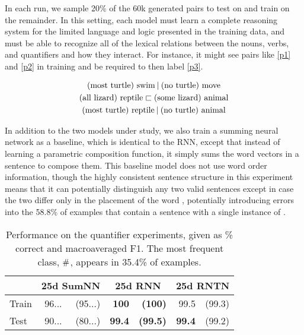 In each run, we sample 20\% of the 60k generated pairs to test on and 
train on the remainder. In this setting, each model must learn a
complete reasoning system for the limited language and logic presented
in the training data, and must be able
to recognize all of the lexical relations between the nouns, verbs,
and quantifiers and how they interact. For instance, it might see
pairs like \eqref{p1} and \eqref{p2} in training and be required to 
then label \eqref{p3}.

\vspace{-0.6cm}
\begin{gather}
  \text{(most turtle) swim} \mathbin{|} \text{(no turtle) move}\label{p1}
  \\
  \text{(all lizard) reptile} \sqsubset  \text{(some lizard) animal}\label{p2}
  \\
  \text{(most turtle) reptile} \mathbin{|} \text{(no turtle) animal}\label{p3}
\end{gather}\vspace{-0.8cm}

In addition to the two models under study, we also train a summing neural network as a baseline, 
which is identical to the RNN, except that instead of learning a parametric composition function,
it simply sums the word vectors in a sentence to compose them. This baseline model does not
use word order information, though the highly consistent sentence structure in this experiment means
that it can potentially distinguish any two valid sentences except in case the two differ only in the placement of the word , potentially introducing errors into the 58.8\% of examples that contain a sentence with a single
instance of .

\begin{table}[tp]
  \centering
  \begin{tabular}{ l r@{ \ }r r@{ \ }r r@{ \ }r }
    \toprule
    ~ & \multicolumn{2}{c}{25d SumNN} & \multicolumn{2}{c}{25d RNN}  & \multicolumn{2}{c}{25d RNTN}\\
    \midrule
    Train &	96...&	(95...)&	\textbf{100}&		\textbf{(100)}&	99.5&	(99.3)\\	
    Test & 90...&	(80...)&	\textbf{99.4}&\textbf{(99.5)}& \textbf{99.4} & (99.2)\\
    \bottomrule
  \end{tabular}
  \caption{Performance on the quantifier experiments, given as \% correct and macroaveraged F1. The most frequent class, $\mathbin{\#}$, appears in 35.4\% of examples.}
  \label{qresultstable}
\end{table} 

